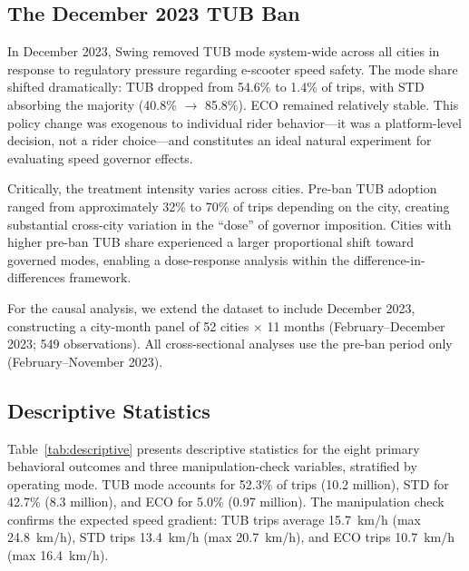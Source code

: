 \subsection{The December 2023 TUB Ban}
\label{sec:data_event}

In December 2023, Swing removed TUB mode system-wide across all cities in response to regulatory pressure regarding e-scooter speed safety. The mode share shifted dramatically: TUB dropped from 54.6\% to 1.4\% of trips, with STD absorbing the majority (40.8\% $\rightarrow$ 85.8\%). ECO remained relatively stable. This policy change was exogenous to individual rider behavior---it was a platform-level decision, not a rider choice---and constitutes an ideal natural experiment for evaluating speed governor effects.

Critically, the treatment intensity varies across cities. Pre-ban TUB adoption ranged from approximately 32\% to 70\% of trips depending on the city, creating substantial cross-city variation in the ``dose'' of governor imposition. Cities with higher pre-ban TUB share experienced a larger proportional shift toward governed modes, enabling a dose-response analysis within the difference-in-differences framework.

For the causal analysis, we extend the dataset to include December 2023, constructing a city-month panel of 52 cities $\times$ 11 months (February--December 2023; 549 observations). All cross-sectional analyses use the pre-ban period only (February--November 2023).

\subsection{Descriptive Statistics}
\label{sec:data_descriptive}

Table~\ref{tab:descriptive} presents descriptive statistics for the eight primary behavioral outcomes and three manipulation-check variables, stratified by operating mode. TUB mode accounts for 52.3\% of trips (10.2 million), STD for 42.7\% (8.3 million), and ECO for 5.0\% (0.97 million). The manipulation check confirms the expected speed gradient: TUB trips average 15.7~km/h (max 24.8~km/h), STD trips 13.4~km/h (max 20.7~km/h), and ECO trips 10.7~km/h (max 16.4~km/h).

